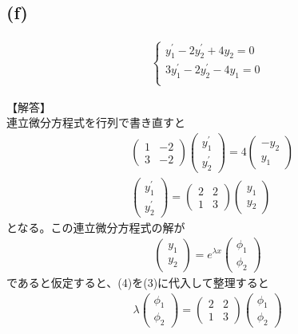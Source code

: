 \documentclass[pdflatex,ja=standard,fleqn]{bxjsarticle}
\begin{document}
\subsection*{(f)}
\begin{screen}
    \begin{eqnarray*}
        \begin{cases}
            y_{1}^{\prime}-2y_{2}^{\prime}+4y_{2}=0\\
            3y_{1}^{\prime}-2y_{2}^{\prime}-4y_{1}=0\\
        \end{cases}
    \end{eqnarray*}
\end{screen}
【解答】\\
連立微分方程式を行列で書き直すと
\begin{align}
    &\begin{pmatrix}1&-2\\3&-2\end{pmatrix}\begin{pmatrix}y_{1}^{\prime}\\y_{2}^{\prime}\end{pmatrix}=4\begin{pmatrix}-y_{2}\\y_{1}\end{pmatrix}\\
    &\begin{pmatrix}y_{1}^{\prime}\\y_{2}^{\prime}\end{pmatrix}=\begin{pmatrix}2&2\\1&3\end{pmatrix}\begin{pmatrix}y_{1}\\y_{2}\end{pmatrix}
\end{align}
となる。この連立微分方程式の解が
\begin{eqnarray}
    \begin{pmatrix}y_{1}\\y_{2}\end{pmatrix}=e^{\lambda x}\begin{pmatrix}\phi_{1}\\\phi_{2}\end{pmatrix}
\end{eqnarray}
であると仮定すると、(4)を(3)に代入して整理すると
\begin{eqnarray*}
    \lambda\begin{pmatrix}\phi_{1}\\\phi_{2}\end{pmatrix}=\begin{pmatrix}2&2\\1&3\end{pmatrix}\begin{pmatrix}\phi_{1}\\\phi_{2}\end{pmatrix}
\end{eqnarray*}
\end{document}
